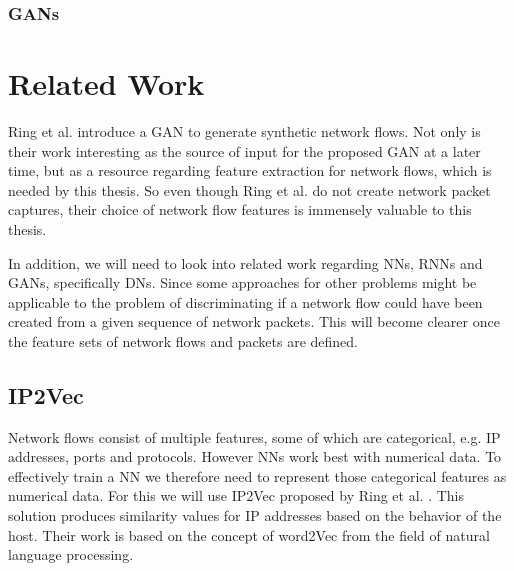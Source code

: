 \documentclass[
	ngerman,
	ruledheaders=section,%
	class=report,%
	thesis={type=bachelor},%
	accentcolor=9c,%
	custommargins=true,%
	marginpar=false,%
	parskip=half-,%
	fontsize=11pt,%
]{tudapub}
\begin{document}

\subsection{GANs}

\chapter{Related Work}

Ring et al. \cite{ringFlowbasedNetworkTraffic2019a} introduce a GAN to generate synthetic network flows.
Not only is their work interesting as the source of input for the proposed GAN at a later time,
but as a resource regarding feature extraction for network flows,
which is needed by this thesis.
So even though Ring et al. \cite{ringFlowbasedNetworkTraffic2019a} do not create network packet captures,
their choice of network flow features is immensely valuable to this thesis.

In addition, we will need to look into related work regarding NNs, RNNs and GANs, specifically DNs.
Since some approaches for other problems might be applicable to the problem of discriminating if a network flow could have been created from a given sequence of network packets.
This will become clearer once the feature sets of network flows and packets are defined.


\section{IP2Vec}

Network flows consist of multiple features, some of which are categorical, e.g. IP addresses, ports and protocols.
However NNs work best with numerical data.
To effectively train a NN we therefore need to represent those categorical features as numerical data.
For this we will use IP2Vec proposed by Ring et al. \cite{ringIP2VecLearningSimilarities2017}.
This solution produces similarity values for IP addresses based on the behavior of the host.
Their work is based on the concept of word2Vec from the field of natural language processing.
\end{document}
